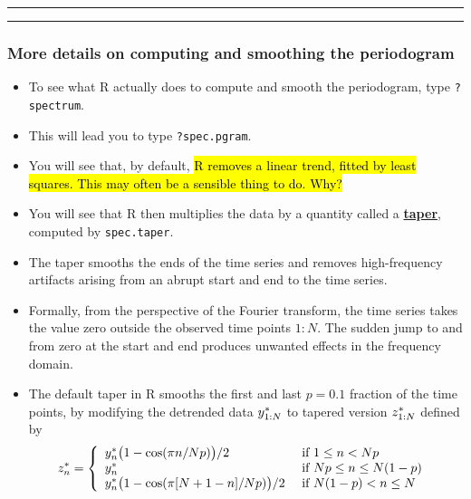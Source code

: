 \documentclass[]{article}
\begin{document}
\begin{center}\rule{0.5\linewidth}{\linethickness}\end{center}

\begin{center}\rule{0.5\linewidth}{\linethickness}\end{center}

\subsubsection{More details on computing and smoothing the
periodogram}\label{more-details-on-computing-and-smoothing-the-periodogram}

\begin{itemize}
\item
  To see what R actually does to compute and smooth the periodogram,
  type \texttt{?spectrum}.
\item
  This will lead you to type \texttt{?spec.pgram}.
\item
  You will see that, by default, \hl{R removes a linear trend, fitted by
  least squares. This may often be a sensible thing to do. Why?}
  
\item
  You will see that R then multiplies the data by a quantity called a
  \href{https://en.wikipedia.org/wiki/Window_function}{\textbf{taper}},
  computed by \texttt{spec.taper}.
\item
  The taper smooths the ends of the time series and removes
  high-frequency artifacts arising from an abrupt start and end to the
  time series.
\item
  Formally, from the perspective of the Fourier transform, the time
  series takes the value zero outside the observed time points \(1:N\).
  The sudden jump to and from zero at the start and end produces
  unwanted effects in the frequency domain.
\item
  The default taper in R smooths the first and last \(p=0.1\) fraction
  of the time points, by modifying the detrended data \(y_{1:N}^*\)
  to tapered version \(z_{1:N}^*\) defined by
  \[ z_n^* = \left\{
  \begin{array}{ll}
  y_n^* \big(1-\cos(\pi n/Np)\big)/2 & \mbox{ if $1\le n< Np$ }
  \\
  y_n^*  & \mbox{ if $Np \le n \le N(1-p)$ }
  \\
  y_n^* \big(1-\cos(\pi [N+1-n]/Np)\big)/2 & \mbox{ if $N(1-p)<n\le N$ }
  \end{array}\right.
  \]
\end{itemize}
\end{document}
